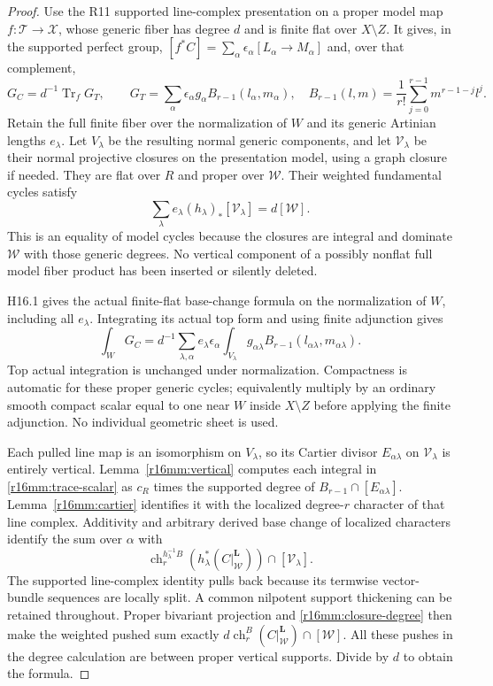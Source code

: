 \begin{proof}
Use the R11 supported line-complex presentation on a proper
model map $f:\mathcal T\to\mathcal X$, whose generic fiber
has degree $d$ and is finite flat over $X\setminus Z$.
It gives, in the supported perfect group,
$[f^*C]=\sum_\alpha\epsilon_\alpha[L_\alpha\to M_\alpha]$
and, over that complement,
\[
 G_C=d^{-1}\operatorname{Tr}_f G_T,
 \qquad
 G_T=\sum_\alpha\epsilon_\alpha g_\alpha
                   B_{r-1}(l_\alpha,m_\alpha),
 \quad
 B_{r-1}(l,m)=\frac1{r!}\sum_{j=0}^{r-1}m^{r-1-j}l^j.
 \tag{MM16.4}\label{r16mm:presentation}
\]
Retain the full finite fiber over the normalization of $W$ and
its generic Artinian lengths $e_\lambda$. Let $V_\lambda$ be
the resulting normal generic components, and let
$\mathcal V_\lambda$ be their normal projective closures on
the presentation model, using a graph closure if needed. They
are flat over $R$ and proper over $\mathcal W$. Their weighted
fundamental cycles satisfy
\[
 \sum_\lambda e_\lambda
                   (h_\lambda)_*[\mathcal V_\lambda]
                                      =d[\mathcal W].
 \tag{MM16.5}\label{r16mm:closure-degree}
\]
This is an equality of model cycles because the closures are
integral and dominate $\mathcal W$ with those generic degrees.
No vertical component of a possibly nonflat full model fiber
product has been inserted or silently deleted.

H16.1 gives the actual finite-flat base-change formula on the
normalization of $W$, including all $e_\lambda$. Integrating
its actual top form and using finite adjunction gives
\[
 \int_WG_C=d^{-1}\sum_{\lambda,\alpha}
 e_\lambda\epsilon_\alpha
       \int_{V_\lambda}g_{\alpha\lambda}
                          B_{r-1}(l_{\alpha\lambda},m_{\alpha\lambda}).
 \tag{MM16.6}\label{r16mm:trace-scalar}
\]
Top actual integration is unchanged under normalization.
Compactness is automatic for these proper generic cycles;
equivalently multiply by an ordinary smooth compact scalar
equal to one near $W$ inside $X\setminus Z$ before applying
the finite adjunction. No individual geometric sheet is used.

Each pulled line map is an isomorphism on $V_\lambda$, so its
Cartier divisor $E_{\alpha\lambda}$ on $\mathcal V_\lambda$
is entirely vertical. Lemma~\ref{r16mm:vertical} computes each
integral in \eqref{r16mm:trace-scalar} as $c_R$ times the
supported degree of $B_{r-1}\cap[E_{\alpha\lambda}]$.
Lemma~\ref{r16mm:cartier} identifies it with the localized
degree-$r$ character of that line complex. Additivity and
arbitrary derived base change of localized characters identify
the sum over $\alpha$ with
\[
 \operatorname{ch}_r^{h_\lambda^{-1}B}
       (h_\lambda^*(C|^{\mathbf L}_{\mathcal W}))
                                         \cap[\mathcal V_\lambda].
\]
The supported line-complex identity pulls back because its
termwise vector-bundle sequences are locally split. A common
nilpotent support thickening can be retained throughout.
Proper bivariant projection and \eqref{r16mm:closure-degree}
then make the weighted pushed sum exactly
$d\operatorname{ch}_r^B(C|^{\mathbf L}_{\mathcal W})\cap[\mathcal W]$.
All these pushes in the degree calculation are between proper
vertical supports. Divide by $d$ to obtain the formula.
\end{proof}

